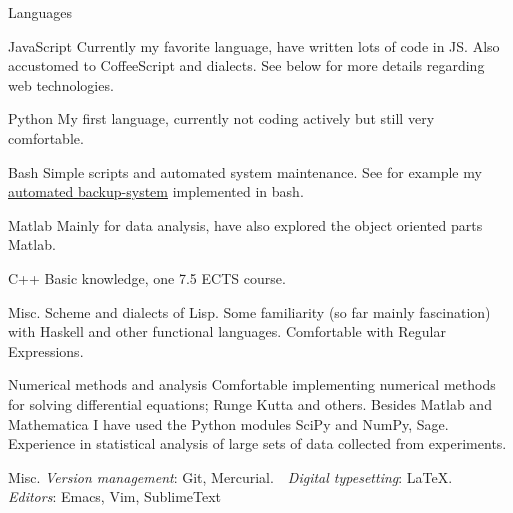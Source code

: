 \begin{myitemize}
  \item[Languages]
    \begin{list}{}{%
      \setlength{\leftmargin}{1.5em}
      \setlength{\itemsep}{0em}
      \setlength{\parskip}{0em}
      \setlength{\parsep}{0.25em}
    }
      \item[JavaScript] Currently my favorite language, have written lots of code
        in JS. Also accustomed to CoffeeScript and dialects. See below for
        more details regarding web technologies.
      \item[Python] My first language, currently not coding actively but still very comfortable.
      \item[Bash] Simple scripts and automated system maintenance. See for example my
        \href{https://github.com/ViktorQvarfordt/automated-incremental-backups}{automated backup-system}
        implemented in bash.
      \item[Matlab] Mainly for data analysis, have also explored the object oriented parts Matlab.
      \item[C++] Basic knowledge, one 7.5 ECTS course.
      \item[Misc.] Scheme and dialects of Lisp. Some familiarity (so far mainly fascination) with
        Haskell and other functional languages. Comfortable with Regular Expressions.
    \end{list}

  \item[Numerical methods and analysis] Comfortable implementing numerical methods for solving
    differential equations; Runge Kutta and others. Besides Matlab and Mathematica I have used
    the Python modules SciPy and NumPy, Sage. Experience in statistical analysis of large
    sets of data collected from experiments.

  \item[Misc.]
    \emph{Version management}: Git, Mercurial. \,\,
    \emph{Digital typesetting}: \LaTeX. \,\,
    \emph{Editors}: Emacs, Vim, SublimeText
\end{myitemize}



